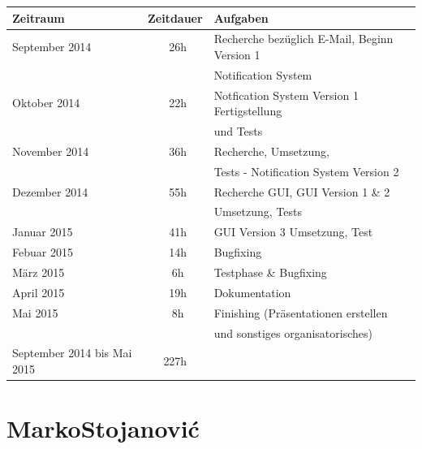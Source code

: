 \documentclass[12pt,a4paper]{report}
\begin{document}
\begin{onehalfspace}
\begin{tabular}{|l|c|l|}
\hline
\textbf{Zeitraum} & \textbf{Zeitdauer} & \textbf{Aufgaben} \\ \hline \hline
September 2014 & ~26h & Recherche bezüglich E-Mail, Beginn Version 1\\&&Notification System \\ \hline
Oktober 2014 & ~22h & Notfication System Version 1 Fertigstellung\\&&und Tests \\ \hline
November 2014 & ~36h & Recherche, Umsetzung, \\&&Tests - Notification System Version 2\\ \hline
Dezember 2014 & ~55h & Recherche GUI, GUI Version 1 \& 2 \\&&Umsetzung, Tests\\ \hline
Januar 2015 & ~41h & GUI Version 3 Umsetzung, Test\\ \hline
Febuar 2015 & ~14h & Bugfixing\\ \hline
März 2015 & ~6h & Testphase \& Bugfixing\\ \hline
April 2015 & ~19h & Dokumentation\\ \hline
Mai 2015 & ~8h & Finishing (Präsentationen erstellen \\&&und sonstiges organisatorisches)\\
\hline \hline
September 2014 bis Mai 2015 & 227h &\\ \hline
\end{tabular}

\chapter{MarkoStojanovi\'{c}}
\begin{center}
\begin{tabular}{|l|c|l|}


\end{tabular}
\end{center}
\end{onehalfspace}
\end{document}

